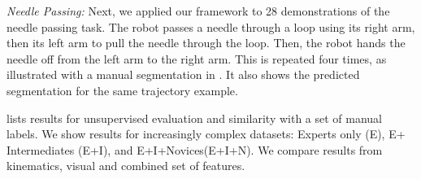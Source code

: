 \vspace{0.5em}
\noindent\textit{Needle Passing: } Next, we applied our framework to 28 demonstrations of the needle passing task.
The robot passes a needle through a loop using its right arm, then its left arm to pull the needle through the loop. Then, the robot hands the needle off from the left arm to the right arm. This is repeated four times, as illustrated with a manual segmentation in . It also shows the predicted segmentation for the same trajectory example. 

 lists results for unsupervised evaluation and similarity with a set of manual labels. We show results for increasingly complex datasets: Experts only (E), E+ Intermediates (E+I), and E+I+Novices(E+I+N). We compare results from kinematics, visual and combined set of features.

